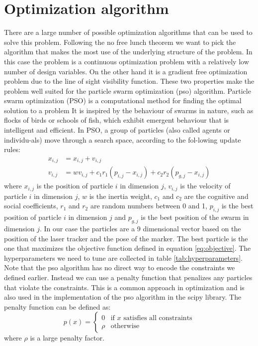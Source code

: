 \documentclass{svproc}
\begin{document}
\section{Optimization algorithm}
There are a large number of possible optimization algorithms that can be used to solve this problem.
Following the no free lunch theorem we want to pick the algorithm that makes the most use of the underlying structure of the problem. %
In this case the problem is a continuous optimization problem with a relatively low number of design variables.
On the other hand it is a gradient free optimization problem due to the line of sight visibility function.
These two properties make the problem well suited for the particle swarm optimization (pso) algorithm.
Particle swarm optimization (PSO) is a computational method for finding the optimal solution to a problem
 It is inspired by the behaviour of swarms in nature, such as flocks of birds or schools of fish, which exhibit emergent behaviour that is intelligent and efficient.
 In PSO, a group of particles (also called agents or individu-als) move through a search space, according to the fol-lowing update rules:
\begin{equation}
        \begin{split}
        x_{i,j} &= x_{i,j} + v_{i,j} \\
    v_{i,j} &= wv_{i,j} + c_1r_1(p_{i,j}-x_{i,j}) + c_2r_2(p_{g,j}-x_{i,j})
        \end{split}
\end{equation}
where $x_{i,j}$ is the position of particle $i$ in dimension $j$, $v_{i,j}$ is the velocity of particle $i$ in dimension $j$, $w$ is the inertia weight,
 $c_1$ and $c_2$ are the cognitive and social coefficients, $r_1$ and $r_2$ are random numbers between 0 and 1, $p_{i,j}$ is the best position of particle $i$ in dimension $j$ and $p_{g,j}$
is the best position of the swarm in dimension $j$.
In our case the particles are a 9 dimensional vector based on the position of the laser tracker and the pose of the marker.
The best particle is the one that maximizes the objective function defined in equation \ref{eq:objective}.
The hyperparameters we need to tune are collected in table \ref{tab:hyperparameters}.
Note that the pso algorithm has no direct way to encode the constraints we defined earlier.
Instead we can use a penalty function that penalizes any particles that violate the constraints.
This is a common approach in optimization and is also used in the implementation of the pso algorithm in the scipy library. %
The penalty function can be defined as:
\begin{equation}
    p(x) =  \begin{cases}
        0 & \text{if } x \text{ satisfies all constraints} \\
        \rho & \text{otherwise}
    \end{cases}
\end{equation}
where $\rho$ is a large penalty factor.
\end{document}
